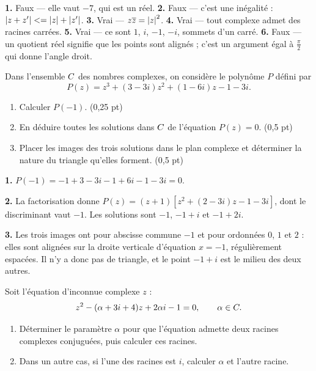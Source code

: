 \begin{corrige}[je me teste]
\textbf{1.} Faux — elle vaut $-7$, qui est un réel.
\textbf{2.} Faux — c'est une inégalité : $\left|z+z'\right| <= \left|z\right|+\left|z'\right|$.
\textbf{3.} Vrai — $z\overline z = \left|z\right|^{2}$.
\textbf{4.} Vrai — tout complexe admet des racines carrées.
\textbf{5.} Vrai — ce sont $1$, $i$, $-1$, $-i$, sommets d'un carré.
\textbf{6.} Faux — un quotient réel signifie que les points sont alignés ;
c'est un argument égal à $\frac{\pi}{2}$ qui donne l'angle droit.
\end{corrige}

\begin{commeaubac}
Dans l'ensemble $C$ des nombres complexes, on considère le polynôme $P$
défini par
\[
  P(z) = z^{3}+(3-3i)z^{2}+(1-6i)z-1-3i .
\]

\begin{enumerate}[label=\textbf{\arabic*.}, leftmargin=*, itemsep=0.25em]
  \item Calculer $P(-1)$. \hfill\textup{(0,25 pt)}
  \item En déduire toutes les solutions dans $C$ de l'équation $P(z) = 0$.
        \hfill\textup{(0,5 pt)}
  \item Placer les images des trois solutions dans le plan complexe et
        déterminer la nature du triangle qu'elles forment.
        \hfill\textup{(0,5 pt)}
\end{enumerate}
\end{commeaubac}

\begin{corrige}
\textbf{1.} $P(-1) = -1+3-3i-1+6i-1-3i = 0$.

\textbf{2.} La factorisation donne
$P(z) = (z+1)\left[z^{2}+(2-3i)z-1-3i\right]$, dont le discriminant vaut
$-1$. Les solutions sont $-1$, $-1+i$ et $-1+2i$.

\textbf{3.} Les trois images ont pour abscisse commune $-1$ et pour ordonnées
$0$, $1$ et $2$ : elles sont alignées sur la droite verticale d'équation
$x = -1$, régulièrement espacées. Il n'y a donc pas de triangle, et le point
$-1+i$ est le milieu des deux autres.
\end{corrige}

\begin{concours}
Soit l'équation d'inconnue complexe $z$ :
\[
  z^{2}-(\alpha+3i+4)z+2\alpha i-1 = 0, \qquad \alpha \in C .
\]

\begin{enumerate}[label=\textbf{\arabic*.}, leftmargin=*, itemsep=0.25em]
  \item Déterminer le paramètre $\alpha$ pour que l'équation admette deux
        racines complexes conjuguées, puis calculer ces racines.
  \item Dans un autre cas, si l'une des racines est $i$, calculer $\alpha$ et
        l'autre racine.
\end{enumerate}
\end{concours}


